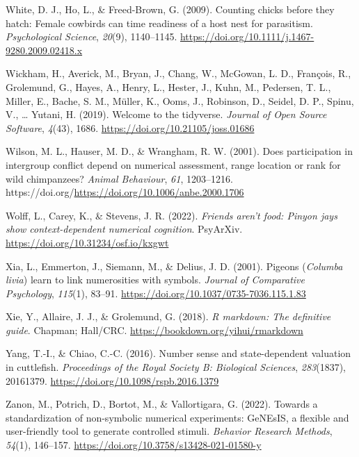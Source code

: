 \documentclass[
  ,pub,floatsintext]{apa6}
\newlength{\cslhangindent}
\newlength{\cslentryspacingunit} %
\newenvironment{CSLReferences}[2] %
 {%
  \setlength{\parindent}{0pt}
  \ifodd #1
  \let\oldpar\par
  \def\par{\hangindent=\cslhangindent\oldpar}
  \fi
  \setlength{\parskip}{#2\cslentryspacingunit}
 }%
 {}
\begin{document}
\begin{CSLReferences}{1}{0}
\leavevmode{}%
White, D. J., Ho, L., \& Freed-Brown, G. (2009). Counting chicks before they hatch: {Female} cowbirds can time readiness of a host nest for parasitism. \emph{Psychological Science}, \emph{20}(9), 1140--1145. \url{https://doi.org/10.1111/j.1467-9280.2009.02418.x}

\leavevmode{}%
Wickham, H., Averick, M., Bryan, J., Chang, W., McGowan, L. D., François, R., Grolemund, G., Hayes, A., Henry, L., Hester, J., Kuhn, M., Pedersen, T. L., Miller, E., Bache, S. M., Müller, K., Ooms, J., Robinson, D., Seidel, D. P., Spinu, V., \ldots{} Yutani, H. (2019). Welcome to the {tidyverse}. \emph{Journal of Open Source Software}, \emph{4}(43), 1686. \url{https://doi.org/10.21105/joss.01686}

\leavevmode{}%
Wilson, M. L., Hauser, M. D., \& Wrangham, R. W. (2001). Does participation in intergroup conflict depend on numerical assessment, range location or rank for wild chimpanzees? \emph{Animal Behaviour}, \emph{61}, 1203--1216. https://doi.org/\url{https://doi.org/10.1006/anbe.2000.1706}

\leavevmode{}%
Wolff, L., Carey, K., \& Stevens, J. R. (2022). \emph{Friends aren't food: Pinyon jays show context-dependent numerical cognition}. PsyArXiv. \url{https://doi.org/10.31234/osf.io/kxgwt}

\leavevmode{}%
Xia, L., Emmerton, J., Siemann, M., \& Delius, J. D. (2001). Pigeons (\emph{{Columba} livia}) learn to link numerosities with symbols. \emph{Journal of Comparative Psychology}, \emph{115}(1), 83--91. \url{https://doi.org/10.1037/0735-7036.115.1.83}

\leavevmode{}%
Xie, Y., Allaire, J. J., \& Grolemund, G. (2018). \emph{R markdown: The definitive guide}. Chapman; Hall/CRC. \url{https://bookdown.org/yihui/rmarkdown}

\leavevmode{}%
Yang, T.-I., \& Chiao, C.-C. (2016). Number sense and state-dependent valuation in cuttlefish. \emph{Proceedings of the Royal Society B: Biological Sciences}, \emph{283}(1837), 20161379. \url{https://doi.org/10.1098/rspb.2016.1379}

\leavevmode{}%
Zanon, M., Potrich, D., Bortot, M., \& Vallortigara, G. (2022). Towards a standardization of non-symbolic numerical experiments: {GeNEsIS}, a flexible and user-friendly tool to generate controlled stimuli. \emph{Behavior Research Methods}, \emph{54}(1), 146--157. \url{https://doi.org/10.3758/s13428-021-01580-y}

\end{CSLReferences}
\end{document}
